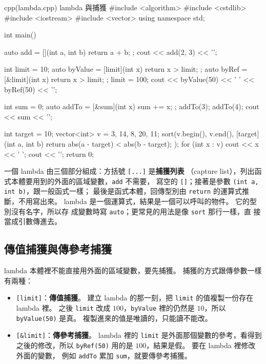 \begin{example}[label=ex:lambda]{cpp}{(lambda.cpp) lambda 與捕獲}
#include <algorithm>
#include <cstdlib>
#include <iostream>
#include <vector>
using namespace std;

int main() {
    auto add = [](int a, int b) { return a + b; };
    cout << add(2, 3) << '\n';

    int limit = 10;
    auto byValue = [limit](int x) { return x > limit; };
    auto byRef = [&limit](int x) { return x > limit; };
    limit = 100;
    cout << byValue(50) << ' ' << byRef(50) << '\n';

    int sum = 0;
    auto addTo = [&sum](int x) { sum += x; };
    addTo(3);
    addTo(4);
    cout << sum << '\n';

    int target = 10;
    vector<int> v = {3, 14, 8, 20, 11};
    sort(v.begin(), v.end(), [target](int a, int b) {
        return abs(a - target) < abs(b - target);
    });
    for (int x : v) {
        cout << x << ' ';
    }
    cout << '\n';
    return 0;
}
\end{example}


一個 lambda 由三個部分組成：方括號 \texttt{[...]} 是\textbf{捕獲列表}
（capture list），列出函式本體要用到的外面的區域變數，\texttt{add} 不需要，
寫空的 \texttt{[]}；接著是參數 \texttt{(int a, int b)}，跟一般函式一樣；
最後是函式本體，回傳型別由 \texttt{return} 的運算式推斷，不用寫出來。
lambda 是一個運算式，結果是一個可以呼叫的物件。 它的型別沒有名字，所以存
成變數時寫 \texttt{auto}；更常見的用法是像 \texttt{sort} 那行一樣，直
接當成引數傳進去。

\subsection{傳值捕獲與傳參考捕獲}

lambda 本體裡不能直接用外面的區域變數，要先捕獲。 捕獲的方式跟傳參數一樣
有兩種：

\begin{itemize}
\item \texttt{[limit]}：\textbf{傳值捕獲}。 建立 lambda 的那一刻，把
\texttt{limit} 的值複製一份存在 lambda 裡。 之後 \texttt{limit} 改成
$100$，\texttt{byValue} 裡的仍然是 $10$，所以 \texttt{byValue(50)} 是真。
複製進來的值是唯讀的，只能讀不能改。
\item \texttt{[\&limit]}：\textbf{傳參考捕獲}。 lambda 裡的
\texttt{limit} 是外面那個變數的參考，看得到之後的修改，所以
\texttt{byRef(50)} 用的是 $100$，結果是假。 要在 lambda 裡修改外面的變數，
例如 \texttt{addTo} 累加 \texttt{sum}，就要傳參考捕獲。
\end{itemize}

